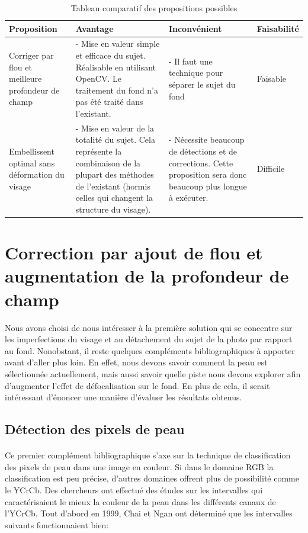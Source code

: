\documentclass[11pt, french]{report-rd-info}
\begin{document}
\begin{table}
\begin{center}
\begin{tabular}{|p{3cm}|p{4cm}|p{4cm}|p{4cm}|}
\hline
Proposition & Avantage & Inconvénient & Faisabilité \\ \hline
Corriger par flou et meilleure profondeur de champ & - Mise en valeur simple et efficace du sujet. Réalisable en utilisant OpenCV. Le traitement du fond n'a pas été traité dans l'existant. & - Il faut une technique pour séparer le sujet du fond & Faisable \\ \hline
Embellissent optimal sans déformation du visage & - Mise en valeur de la totalité du sujet. Cela représente la combinaison de la plupart des méthodes de l'existant (hormis celles qui changent la structure du visage). & - Nécessite beaucoup de détections et de corrections. Cette proposition sera donc beaucoup plus longue à exécuter. & Difficile \\ \hline
\end{tabular}
\end{center}
\caption{Tableau comparatif des propositions possibles}
\label{tab:compprop}
\end{table}


\section{Correction par ajout de flou et augmentation de la profondeur de champ}
Nous avons choisi de nous intéresser à la première solution qui se concentre sur les imperfections du visage et au détachement du sujet de la photo par rapport au fond. Nonobstant, il reste quelques compléments bibliographiques à apporter avant d'aller plus loin. En effet, nous devons savoir comment la peau est sélectionnée actuellement, mais aussi savoir quelle piste nous devons explorer afin d'augmenter l'effet de défocalisation sur le fond. En plus de cela, il serait intéressant d'énoncer une manière d'évaluer les résultats obtenus.


\subsection{Détection des pixels de peau}
\paragraph*{}
Ce premier complément bibliographique s'axe sur la technique de classification des pixels de peau dans une image en couleur. Si dans le domaine RGB la classification est peu précise, d'autres domaines offrent plus de possibilité comme le YCrCb. Des chercheurs ont effectué des études sur les intervalles qui caractérisaient le mieux la couleur de la peau dans les différents canaux de l'YCrCb. Tout d'abord en 1999, Chai et Ngan \cite{Chai1999} ont déterminé que les intervalles suivants fonctionnaient bien: 
\end{document}
